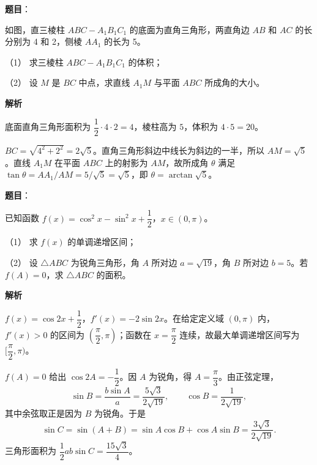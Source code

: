 \begin{answer}

\textbf{题目}：

如图，直三棱柱 $ABC-A_1B_1C_1$ 的底面为直角三角形，两直角边 $AB$ 和 $AC$ 的长分别为 4 和 2，侧棱 $AA_1$ 的长为 5。

（1） 求三棱柱 $ABC-A_1B_1C_1$ 的体积；

（2） 设 $M$ 是 $BC$ 中点，求直线 $A_1M$ 与平面 $ABC$ 所成角的大小。
\nopagebreak[4]
\begin{center}\end{center}
\nopagebreak[4]
\textbf{解析}


底面直角三角形面积为 $\dfrac12\cdot4\cdot2=4$，棱柱高为 $5$，体积为 $4\cdot5=20$。


$BC=\sqrt{4^2+2^2}=2\sqrt5$。直角三角形斜边中线长为斜边的一半，所以 $AM=\sqrt5$。直线 $A_1M$ 在平面 $ABC$ 上的射影为 $AM$，故所成角 $\theta$ 满足 $\tan\theta=AA_1/AM=5/\sqrt5=\sqrt5$，即 $\theta=\arctan\sqrt5$。



\end{answer}
\begin{answer}

\textbf{题目}：

已知函数 $f(x)=\cos^2x-\sin^2x+\dfrac12$，$x\in(0,\pi)$。

（1） 求 $f(x)$ 的单调递增区间；

（2） 设 $\triangle ABC$ 为锐角三角形，角 $A$ 所对边 $a=\sqrt{19}$，角 $B$ 所对边 $b=5$。若 $f(A)=0$，求 $\triangle ABC$ 的面积。

\textbf{解析}


$f(x)=\cos2x+\dfrac12$，$f'(x)=-2\sin2x$。在给定定义域 $(0,\pi)$ 内，$f'(x)>0$ 的区间为 $(\dfrac\pi2,\pi)$；函数在 $x=\dfrac\pi2$ 连续，故最大单调递增区间写为 $[\dfrac\pi2,\pi)$。


$f(A)=0$ 给出 $\cos2A=-\dfrac12$。因 $A$ 为锐角，得 $A=\dfrac\pi3$。由正弦定理，
\nopagebreak[4]
\[
\sin B=\frac{b\sin A}{a}=\frac{5\sqrt3}{2\sqrt{19}},\qquad \cos B=\frac1{2\sqrt{19}},
\]
其中余弦取正是因为 $B$ 为锐角。于是
\nopagebreak[4]
\[
\sin C=\sin(A+B)=\sin A\cos B+\cos A\sin B=\frac{3\sqrt3}{2\sqrt{19}}.
\]
三角形面积为 $\dfrac12 ab\sin C=\dfrac{15\sqrt3}{4}$。

\gkanswer{答案（1）：$[\dfrac\pi2,\pi)$}


\end{answer}
